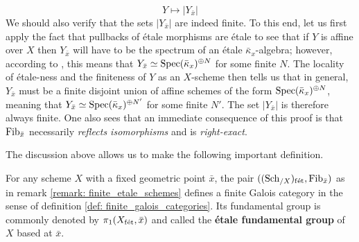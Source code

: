 \begin{remark}
                        $$Y \mapsto |Y_{\bar{x}}|$$
                    We should also verify that the sets $|Y_{\bar{x}}|$ are indeed finite. To this end, let us first apply the fact that pullbacks of \'etale morphisms are \'etale to see that if $Y$ is affine over $X$ then $Y_{\bar{x}}$ will have to be the spectrum of an \'etale $\bar{\kappa}_x$-algebra; however, according to \cite[\href{https://stacks.math.columbia.edu/tag/00U3}{Tag 00U3}]{stacks}, this means that $Y_{\bar{x}} \simeq \mathrm{Spec} (\bar{\kappa}_x)^{\oplus N}$ for some finite $N$. The locality of \'etale-ness and the finiteness of $Y$ as an $X$-scheme then tells us that in general, $Y_{\bar{x}}$ must be a finite disjoint union of affine schemes of the form $\mathrm{Spec} (\bar{\kappa}_x)^{\oplus N}$, meaning that $Y_{\bar{x}} \simeq \mathrm{Spec} (\bar{\kappa}_x)^{\oplus N'}$ for some finite $N'$. The set $|Y_{\bar{x}}|$ is therefore always finite. One also sees that an immediate consequence of this proof is that $\mathrm{Fib}_{\bar{x}}$ necessarily \textit{reflects isomorphisms} and is \textit{right-exact}. 
                \end{remark}
                
                The discussion above allows us to make the following important definition.
                \begin{definition} \label{def: etale_fundamental_groups_of_schemes}
                    For any scheme $X$ with a fixed geometric point $\bar{x}$, the pair $((\mathrm{Sch}_{/X})_{\mathrm{f\acute{e}t}}, \mathrm{Fib}_{\bar{x}})$ as in remark \ref{remark: finite_etale_schemes} defines a finite Galois category in the sense of definition \ref{def: finite_galois_categories}. Its fundamental group is commonly denoted by $\pi_1(X_{\mathrm{f\acute{e}t}}, \bar{x})$ and called the \textbf{\'etale fundamental group} of $X$ based at $\bar{x}$.
                \end{definition}
                
